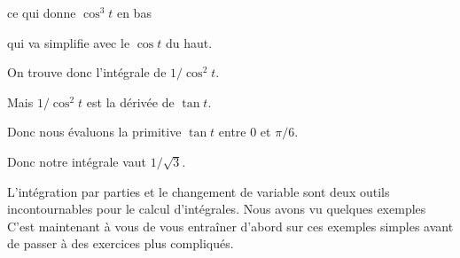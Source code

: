 \change

ce qui donne $\cos^3 t$ en bas

\change

qui va simplifie avec le $\cos t$ du haut.

On trouve donc l'intégrale de $1/\cos^2 t$.

\change

Mais $1/\cos^2 t$ est la dérivée de $\tan t$.

Donc nous évaluons la primitive $\tan t$ entre $0$ et $\pi/6$.


\change

Donc notre intégrale vaut $1/\sqrt3$.


\diapo

L'intégration par parties et le changement de variable sont deux outils incontournables
pour le calcul d'intégrales. Nous avons vu quelques exemples
C'est maintenant à vous de vous entraîner d'abord sur ces exemples simples
avant de passer à des exercices plus compliqués.


